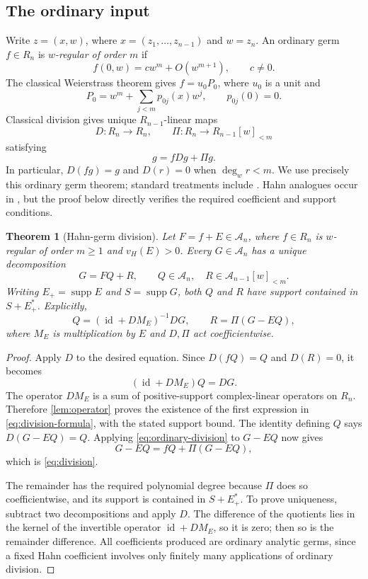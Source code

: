 \documentclass[11pt,letterpaper]{article}
\newtheorem{theorem}{Theorem}[section]
\theoremstyle{definition}
\theoremstyle{remark}
\newcommand{\A}{\mathscr A}
\newcommand{\supp}{\operatorname{supp}}
\newcommand{\id}{\operatorname{id}}
\newcommand{\vH}{v_{\!H}}
\numberwithin{equation}{section}
\begin{document}
\subsection{The ordinary input}
Write $z=(x,w)$, where $x=(z_1,\ldots,z_{n-1})$ and $w=z_n$. An ordinary germ $f\in R_n$ is \emph{$w$-regular of order $m$} if
\[
 f(0,w)=c w^m+O(w^{m+1}),\qquad c\ne0.
\]
The classical Weierstrass theorem gives $f=u_0P_0$, where $u_0$ is a unit and
\[
 P_0=w^m+\sum_{j<m}p_{0j}(x)w^j,\qquad p_{0j}(0)=0.
\]
Classical division gives unique $R_{n-1}$-linear maps
\[
 D:R_n\to R_n,\qquad
 \Pi:R_n\to R_{n-1}[w]_{<m}
\]
satisfying
\begin{equation}\label{eq:ordinary-division}
 g=fDg+\Pi g.
\end{equation}
In particular, $D(fg)=g$ and $D(r)=0$ when $\deg_w r<m$. We use precisely this ordinary germ theorem; standard treatments include \cite{GR}. Hahn analogues occur in \cite{CL,CLR}, but the proof below directly verifies the required coefficient and support conditions.

\begin{theorem}[Hahn-germ division]\label{thm:division}
Let $F=f+E\in\A_n$, where $f\in R_n$ is $w$-regular of order $m\ge1$ and $\vH(E)>0$. Every $G\in\A_n$ has a unique decomposition
\begin{equation}\label{eq:division}
 G=FQ+R,\qquad Q\in\A_n,\quad R\in\A_{n-1}[w]_{<m}.
\end{equation}
Writing $E_+=\supp E$ and $S=\supp G$, both $Q$ and $R$ have support contained in $S+E_+^*$. Explicitly,
\begin{equation}\label{eq:division-formula}
 Q=(\id+D M_E)^{-1}DG,
 \qquad R=\Pi(G-EQ),
\end{equation}
where $M_E$ is multiplication by $E$ and $D,\Pi$ act coefficientwise.
\end{theorem}
\begin{proof}
Apply $D$ to the desired equation. Since $D(fQ)=Q$ and $D(R)=0$, it becomes
\[
 (\id+D M_E)Q=DG.
\]
The operator $D M_E$ is a sum of positive-support complex-linear operators on $R_n$. Therefore \cref{lem:operator} proves the existence of the first expression in \eqref{eq:division-formula}, with the stated support bound. The identity defining $Q$ says $D(G-EQ)=Q$. Applying \eqref{eq:ordinary-division} to $G-EQ$ now gives
\[
 G-EQ=fQ+\Pi(G-EQ),
\]
which is \eqref{eq:division}.

The remainder has the required polynomial degree because $\Pi$ does so coefficientwise, and its support is contained in $S+E_+^*$. To prove uniqueness, subtract two decompositions and apply $D$. The difference of the quotients lies in the kernel of the invertible operator $\id+D M_E$, so it is zero; then so is the remainder difference. All coefficients produced are ordinary analytic germs, since a fixed Hahn coefficient involves only finitely many applications of ordinary division.
\end{proof}
\end{document}
